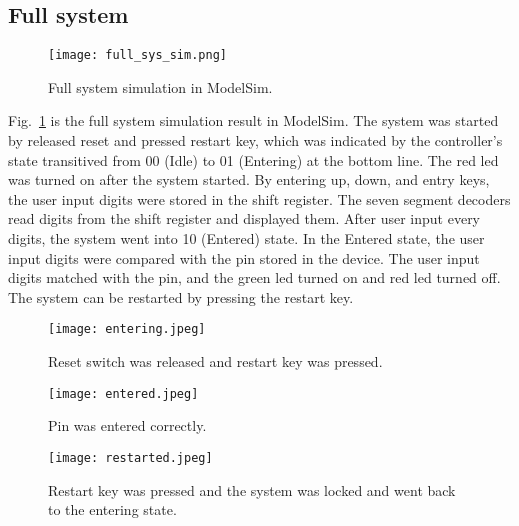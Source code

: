 \subsection{Full system}

\begin{figure}[htbp]
   \centerline{
   \texttt{[image: full\_sys\_sim.png]}}
   \caption{Full system simulation in ModelSim.}
   \label{fig:full_sys_sim}
\end{figure}

Fig.~\ref{fig:full_sys_sim} is the full system simulation result in ModelSim. The system was started by released reset and pressed restart key, which was indicated by the controller's state transitived from 00 (Idle) to 01 (Entering) at the bottom line. The red led was turned on after the system started. By entering up, down, and entry keys, the user input digits were stored in the shift register. The seven segment decoders read digits from the shift register and displayed them. After user input every digits, the system went into 10 (Entered) state. In the Entered state, the user input digits were compared with the pin stored in the device. The user input digits matched with the pin, and the green led turned on and red led turned off. The system can be restarted by pressing the restart key.

\begin{figure}[htbp]
   \centerline{
   \texttt{[image: entering.jpeg]}}
   \caption{Reset switch was released and restart key was pressed.}
   \label{fig:entering}
\end{figure}

\begin{figure}[htbp]
   \centerline{
   \texttt{[image: entered.jpeg]}}
   \caption{Pin was entered correctly.}
   \label{fig:entered}
\end{figure}

\begin{figure}[htbp]
   \centerline{
   \texttt{[image: restarted.jpeg]}}
   \caption{Restart key was pressed and the system was locked and went back to the entering state.}
   \label{fig:restarted}
\end{figure}

